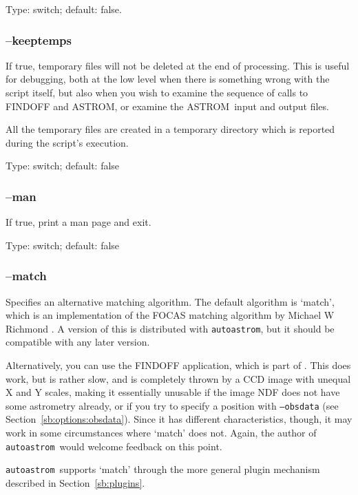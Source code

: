 \documentclass[twoside,11pt,nolof]{starlink}
\providecommand{\ASTROM}{{\footnotesize ASTROM}\normalsize}
\providecommand{\autoastrom}{\texttt{autoastrom}}
\providecommand{\CCDPACKref}{\xref{{\footnotesize CCDPACK}}{sun139}{}}
\begin{document}
Type: switch; default: false.

\subsubsection{--keeptemps\label{sb:options:keeptemps}}

If true, temporary files will not be deleted at the end of processing.  This
is useful for debugging, both at the low level when there is something wrong
with the script itself, but also when you wish to examine the sequence of
calls to FINDOFF and \ASTROM, or examine the \ASTROM\ input and output
files.

All the temporary files are created in a temporary directory which is
reported during the script's execution.

Type: switch; default: false

\subsubsection{--man\label{sb:options:man}}

If true, print a man page and exit.

Type: switch; default: false

\subsubsection{--match\label{sb:options:match}}

Specifies an alternative matching algorithm.  The default algorithm is
`match', which is an implementation of the FOCAS matching algorithm
\cite{valdes95} by Michael W Richmond \cite{match-home}.  A version of this is
distributed with \autoastrom, but it should be compatible with any later
version.

Alternatively, you can use the FINDOFF application, which is part of
\CCDPACKref.  This does work, but is rather slow, and is completely thrown by
a CCD image with unequal X and Y scales, making it essentially unusable if the
image NDF does not have some astrometry already, or if you try to specify a
position with \texttt{--obsdata} (see Section~\ref{sb:options:obsdata}).
Since it has different characteristics, though, it may work in some
circumstances where `match' does not.  Again, the author of \autoastrom\ would
welcome feedback on this point.

\autoastrom\ supports `match' through the more general plugin mechanism
described in Section~\ref{sb:plugins}.
\end{document}
